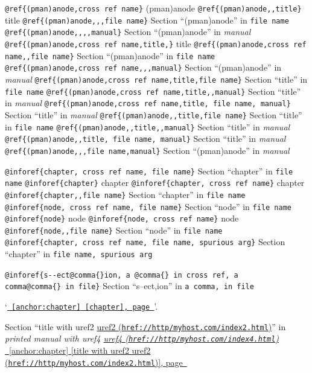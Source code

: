 \documentclass{book}
\renewcommand{\_}{\Texinfounderscore\discretionary{}{}{}}
\begin{document}
{\texttt{@ref\{(pman)anode,cross ref name\}} (pman)anode
\texttt{@ref\{(pman)anode{,}{,}title\}} title
\texttt{@ref\{(pman)anode{,}{,},file name\}} Section ``(pman)anode'' in \texttt{file name}
\texttt{@ref\{(pman)anode{,}{,}{,}{,}manual\}} Section ``(pman)anode'' in \textsl{manual}
\texttt{@ref\{(pman)anode,cross ref name,title,\}} title
\texttt{@ref\{(pman)anode,cross ref name{,}{,}file name\}} Section ``(pman)anode'' in \texttt{file name}
\texttt{@ref\{(pman)anode,cross ref name{,}{,},manual\}} Section ``(pman)anode'' in \textsl{manual}
\texttt{@ref\{(pman)anode,cross ref name,title,file name\}} Section ``title'' in \texttt{file name}
\texttt{@ref\{(pman)anode,cross ref name,title{,}{,}manual\}} Section ``title'' in \textsl{manual}
\texttt{@ref\{(pman)anode,cross ref name,title,\ file name,\ manual\}} Section ``title'' in \textsl{manual}
\texttt{@ref\{(pman)anode{,}{,}title,file name\}} Section ``title'' in \texttt{file name}
\texttt{@ref\{(pman)anode{,}{,}title{,}{,}manual\}} Section ``title'' in \textsl{manual}
\texttt{@ref\{(pman)anode{,}{,}title,\ file name,\ manual\}} Section ``title'' in \textsl{manual}
\texttt{@ref\{(pman)anode{,}{,},file name,manual\}} Section ``(pman)anode'' in \textsl{manual}


\texttt{@inforef\{chapter,\ cross ref name,\ file name\}} Section ``chapter'' in \texttt{file name}
\texttt{@inforef\{chapter\}} chapter
\texttt{@inforef\{chapter,\ cross ref name\}} chapter
\texttt{@inforef\{chapter{,}{,}file name\}} Section ``chapter'' in \texttt{file name}
\texttt{@inforef\{node,\ cross ref name,\ file name\}} Section ``node'' in \texttt{file name}
\texttt{@inforef\{node\}} node
\texttt{@inforef\{node,\ cross ref name\}} node
\texttt{@inforef\{node{,}{,}file name\}} Section ``node'' in \texttt{file name}
\texttt{@inforef\{chapter,\ cross ref name,\ file name,\ spurious arg\}} Section ``chapter'' in \texttt{file name,\ spurious arg}

\texttt{@inforef\{s{-}{-}ect@comma\{\}ion,\ a @comma\{\}\ in cross
ref,\ a comma@comma\{\}\ in file\}}
Section ``s--ect,ion'' in \texttt{a comma,\ in file}

`\texttt{\hyperref[anchor:chapter]{\chaptername~\ref*{anchor:chapter} [chapter], page~\pageref*{anchor:chapter}}}'.

Section ``title with uref2 \href{href://http/myhost.com/index2.html}{uref2 (\nolinkurl{href://http/myhost.com/index2.html})}'' in \textsl{printed manual with uref4 \href{href://http/myhost.com/index4.html}{uref4 (\nolinkurl{href://http/myhost.com/index4.html})}}
\hyperref[anchor:chapter]{\chaptername~\ref*{anchor:chapter} [title with uref2 \href{href://http/myhost.com/index2.html}{uref2 (\nolinkurl{href://http/myhost.com/index2.html})}], page~\pageref*{anchor:chapter}}

}
\end{document}
